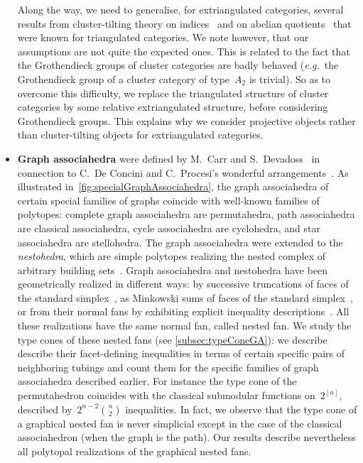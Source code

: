 \documentclass{amsart}
\theoremstyle{definition}
\newcommand{\eg}{\textit{e.g.}~} %
\newcommand{\darkblue}{\color{darkblue}} %
\newcommand{\defn}[1]{\textsl{\darkblue #1}} %
\begin{document}
\begin{itemize}
Along the way, we need to generalise, for extriangulated categories, several results from cluster-tilting theory on indices~\cite{DehyKeller} and on abelian quotients~\cite{BuanMarshReiten, KellerReiten} that were known for triangulated categories.
We note however, that our assumptions are not quite the expected ones.
This is related to the fact that the Grothendieck groups of cluster categories are badly behaved (\eg the Grothendieck group of a cluster category of type~$A_2$ is trivial).
So as to overcome this difficulty, we replace the triangulated structure of cluster categories by some relative extriangulated structure, before considering Grothendieck groups.
This explains why we consider projective objects rather than cluster-tilting objects for extriangulated categories.

\smallskip
\item \textbf{Graph associahedra} were defined by M.~Carr and S.~Devadoss~\cite{CarrDevadoss} in connection to C.~De Concini and C.~Procesi's wonderful arrangements~\cite{DeConciniProcesi}. As illustrated in~\cref{fig:specialGraphAssociahedra}, the graph associahedra of certain special families of graphs coincide with well-known families of polytopes: complete graph associahedra are permutahedra, path associahedra are classical associahedra, cycle associahedra are cyclohedra, and star associahedra are stellohedra. The graph associahedra were extended to the \defn{nestohedra}, which are simple polytopes realizing the nested complex of arbitrary building sets~\cite{Postnikov, FeichtnerSturmfels}. Graph associahedra and nestohedra have been geometrically realized in different ways: by successive truncations of faces of the standard simplex~\cite{CarrDevadoss}, as Minkowski sums of faces of the standard simplex~\cite{Postnikov, FeichtnerSturmfels}, or from their normal fans by exhibiting explicit inequality descriptions~\cite{Devadoss, Zelevinsky}. All these realizations have the same normal fan, called nested fan. We study the type cones of these nested fans (see \cref{subsec:typeConeGA}): we describe describe their facet-defining inequalities in terms of certain specific pairs of neighboring tubings and count them for the specific families of graph associahedra described earlier. For instance the type cone of the permutahedron coincides with the classical submodular functions on~$2^{[n]}$, described by~$2^{n-2} \binom{n}{2}$ inequalities. In fact, we observe that the type cone of a graphical nested fan is never simplicial except in the case of the classical associahedron (when the graph is the path). Our results describe nevertheless all polytopal realizations of the graphical nested fans.
\end{itemize}
\end{document}
